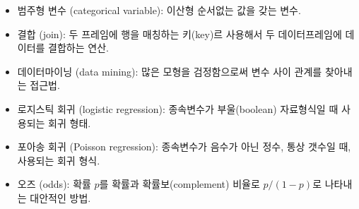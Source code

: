 \begin{itemize}
\item 범주형 변수 (categorical variable): 이산형 순서없는 값을 갖는 변수.

\item 결합 (join): 두 프레임에 행을 매칭하는 키(key)르 사용해서 두 데이터프레임에 데이터를 결합하는 연산.

\item 데이터마이닝 (data mining): 많은 모형을 검정함으로써 변수 사이 관계를 찾아내는 접근법.

\item 로지스틱 회귀 (logistic regression): 종속변수가 부울(boolean) 자료형식일 때 사용되는 회귀 형태.

\item 포아송 회귀 (Poisson regression): 종속변수가 음수가 아닌 정수, 통상 갯수일 때, 사용되는 회귀 형식.

\item 오즈 (odds): 확률 $p$를 확률과 확률보(complement) 비율로 $p / (1-p)$로 나타내는 대안적인 방법.

\end{itemize}

